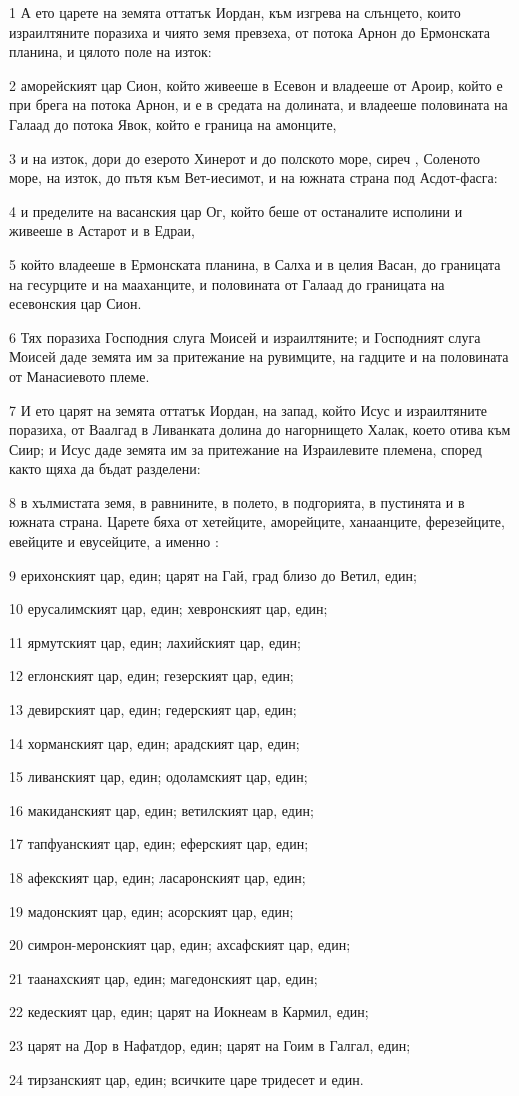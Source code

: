 \par 1 А ето царете на земята оттатък Иордан, към изгрева на слънцето, които израилтяните поразиха и чиято земя превзеха, от потока Арнон до Ермонската планина, и цялото поле на изток:
\par 2 аморейският цар Сион, който живееше в Есевон и владееше от Ароир, който е при брега на потока Арнон, и е в средата на долината, и владееше половината на Галаад до потока Явок, който е граница на амонците,
\par 3 и на изток, дори до езерото Хинерот и до полското море, сиреч , Соленото море, на изток, до пътя към Вет-иесимот, и на южната страна под Асдот-фасга:
\par 4 и пределите на васанския цар Ог, който беше от останалите исполини и живееше в Астарот и в Едраи,
\par 5 който владееше в Ермонската планина, в Салха и в целия Васан, до границата на гесурците и на мааханците, и половината от Галаад до границата на есевонския цар Сион.
\par 6 Тях поразиха Господния слуга Моисей и израилтяните; и Господният слуга Моисей даде земята им за притежание на рувимците, на гадците и на половината от Манасиевото племе.
\par 7 И ето царят на земята оттатък Иордан, на запад, който Исус и израилтяните поразиха, от Ваалгад в Ливанката долина до нагорнището Халак, което отива към Сиир; и Исус даде земята им за притежание на Израилевите племена, според както щяха да бъдат разделени:
\par 8 в хълмистата земя, в равнините, в полето, в подгорията, в пустинята и в южната страна. Царете бяха от хетейците, аморейците, ханаанците, ферезейците, евейците и евусейците, а именно :
\par 9 ерихонският цар, един; царят на Гай, град близо до Ветил, един;
\par 10 ерусалимският цар, един; хевронският цар, един;
\par 11 ярмутският цар, един; лахийският цар, един;
\par 12 еглонският цар, един; гезерският цар, един;
\par 13 девирският цар, един; гедерският цар, един;
\par 14 хорманският цар, един; арадският цар, един;
\par 15 ливанският цар, един; одоламският цар, един;
\par 16 макиданският цар, един; ветилският цар, един;
\par 17 тапфуанският цар, един; еферският цар, един;
\par 18 афекският цар, един; ласаронският цар, един;
\par 19 мадонският цар, един; асорският цар, един;
\par 20 симрон-меронският цар, един; ахсафският цар, един;
\par 21 таанахският цар, един; магедонският цар, един;
\par 22 кедеският цар, един; царят на Иокнеам в Кармил, един;
\par 23 царят на Дор в Нафатдор, един; царят на Гоим в Галгал, един;
\par 24 тирзанският цар, един; всичките царе тридесет и един.

